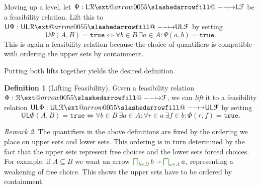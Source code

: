 \documentclass[12pt]{article}
\makeatletter
\theoremstyle{definition}
\newtheorem{definition}{Definition}[section]
\theoremstyle{plain}
\theoremstyle{plain}
\theoremstyle{plain}
\theoremstyle{plain}
\theoremstyle{remark}
\theoremstyle{remark}
\newtheorem{remark}[definition]{Remark}
\newcommand{\mc}[1]{\mathcal{#1}}
\newcommand{\sub}{\subseteq}
\newcommand{\low}{\mathsf{L}}
\newcommand{\upper}{\mathsf{U}}
\newcommand{\true}{\mathtt{true}}
\def\slashedarrowfill@#1#2#3#4#5{%
	$\m@th\thickmuskip0mu\medmuskip\thickmuskip\thinmuskip\thickmuskip
	\relax#5#1\mkern-7mu%
	\cleaders\hbox{$#5\mkern-2mu#2\mkern-2mu$}\hfill
	\mathclap{#3}\mathclap{#2}%
	\cleaders\hbox{$#5\mkern-2mu#2\mkern-2mu$}\hfill
	\mkern-7mu#4$%
}
\def\rightslashedarrowfill@{%
	\slashedarrowfill@\relbar\relbar\mapstochar\rightarrow}
\newcommand\xslashedrightarrow[2][]{%
	\ext@arrow 0055{\rightslashedarrowfill@}{#1}{#2}}
\newcommand{\cbigsqcap}[1]{\color{OliveGreen}\bigsqcap_{#1}\color{Black}}
\makeatother
\begin{document}
Moving up a level, let $\Psi: \low\mc{R} \xslashedrightarrow{} \low\mc{F}$ be a feasibility relation. Lift this to $\upper\Psi: \upper\low\mc{R} \xslashedrightarrow{} \upper\low\mc{F}$ by setting  
$$\upper\Psi(A,B) = \true \iff \forall b \in B \: \exists a \in A: \Psi(a,b)=\true.$$
This is again a feasibility relation because the choice of quantifiers is compatible with ordering the upper sets by containment. 

Putting both lifts together yields the desired definition.

\begin{definition}[Lifting Feasibility]\label{def:lift feas}
	 Given a feasibility relation $\Phi: \mc{R} \xslashedrightarrow{} \mc{F}$, we can \emph{lift} it to a feasibility relation $\upper\low\Phi: \upper\low\mc{R} \xslashedrightarrow{} \upper\low\mc{F}$ by setting
	$$ \upper\low\Phi(A,B) = \true \iff \forall b \in B \: \exists a \in A: \forall r \in a \: \exists f \in b: \Phi(r,f) = \true.$$
\end{definition}

\begin{remark}
	The quantifiers in the above definitions are fixed by the ordering we place on upper sets and lower sets. This ordering is in turn determined by the fact that the upper sets represent free choices and the lower sets forced choices. For example, if $A \sub B$ we want an arrow $\cbigsqcap{b \in B} b \shortrightarrow \cbigsqcap{a \in A} a$, representing a weakening of free choice. This shows the upper sets have to be ordered by containment.
\end{remark}
\end{document}
